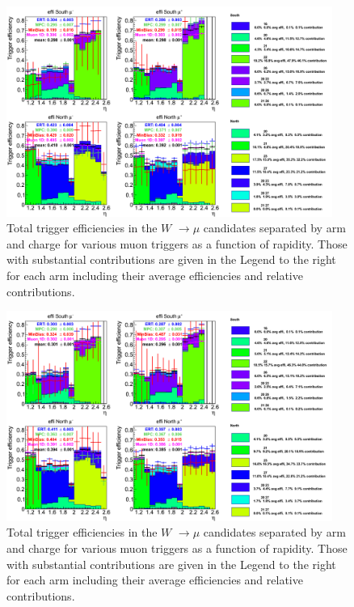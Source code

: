 \begin{figure}[h!]

  \centering

  \includegraphics[width=0.95\textwidth]{./figures/totaltrigeffi13_all_wpt2.png}
  \caption{\label{fig:totaltrigeffi_all_wpt2} Total trigger efficiencies in the $W$ $\rightarrow \mu$ candidates separated by arm and charge for various muon triggers as a function of rapidity. Those with substantial contributions are given in the Legend to the right for each arm including their average efficiencies and relative contributions.}

\end{figure}
\clearpage
\begin{figure}[h!]

  \centering

  \includegraphics[width=0.95\textwidth]{./figures/totaltrigeffi13_all_wpt3.png}
  \caption{\label{fig:totaltrigeffi_all_wpt3} Total trigger efficiencies in the $W$ $\rightarrow \mu$ candidates separated by arm and charge for various muon triggers as a function of rapidity. Those with substantial contributions are given in the Legend to the right for each arm including their average efficiencies and relative contributions.}

\end{figure}
\clearpage

